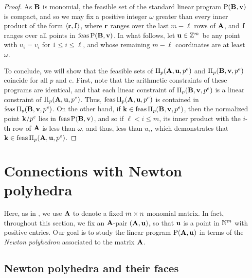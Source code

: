 \documentclass{article}
\begin{document}
\begin{proof}  As $\mathbf{B}$ is monomial, the feasible set of the standard linear program $\mathrm{P}(\mathbf{B}, \mathbf{v})$ is compact, and so we may fix a positive integer $\omega$ greater than every inner product of the form $\langle \mathbf{r}, \mathbf{f} \rangle$, where $\mathbf{r}$ ranges over the last $m-\ell$ rows of $\mathbf{A}$, and $\mathbf{f}$ ranges over all points in $\operatorname{feas} \mathrm{P}(\mathbf{B},\mathbf{v})$. In what follows, let $\mathbf{u} \in \mathbb{Z}^{m}$ be any point with $u_i = v_i$ for $1 \leq i \leq \ell$, and whose remaining $m-\ell$ coordinates are at least $\omega$. 

To conclude, we will show that the feasible sets of $\Pi_p(\mathbf{A}, \mathbf{u}, p^e)$ and $\Pi_p(\mathbf{B}, \mathbf{v}, p^e)$ coincide for all $p$ and $e$.  First, note that the arithmetic constraints of these programs are identical, and that each linear constraint of $\Pi_p(\mathbf{B}, \mathbf{v}, p^e)$ is a linear constraint of $\Pi_p(\mathbf{A}, \mathbf{u},p^e)$.  Thus, $\operatorname{feas} \Pi_p(\mathbf{A}, \mathbf{u}, p^e)$ is contained in $\operatorname{feas} \Pi_p(\mathbf{B}, \mathbf{v}, p^e)$.  On the other hand, if $\mathbf{k} \in \operatorname{feas} \Pi_p(\mathbf{B}, \mathbf{v}, p^e)$, then the normalized point $\mathbf{k}/p^e$ lies in $\operatorname{feas} \mathrm{P}(\mathbf{B}, \mathbf{v})$, and so if $\ell < i \leq m$, its inner product with the $i$-th row of $\mathbf{A}$ is less than $\omega$, and thus, less than $u_i$, which demonstrates that $\mathbf{k} \in \operatorname{feas} \Pi_p(\mathbf{A}, \mathbf{u}, p^e)$.  
\end{proof}


\section{Connections with Newton polyhedra}
\label{s: newton}
Here, as in ,  we use $\mathbf{A}$ to denote a fixed $m \times n$ monomial matrix.
In fact, throughout this section, we fix an $\mathbf{A}$-pair $(\mathbf{A}, \mathbf{u})$, so that $\mathbf{u}$ is a point in $\mathbb{N}^m$ with positive entries.
Our goal is to study the linear program $\mathrm{P}(\mathbf{A}, \mathbf{u})$ in terms of the \emph{Newton polyhedron} associated to the matrix $\mathbf{A}$.

\subsection{Newton polyhedra and their faces}
\end{document}
